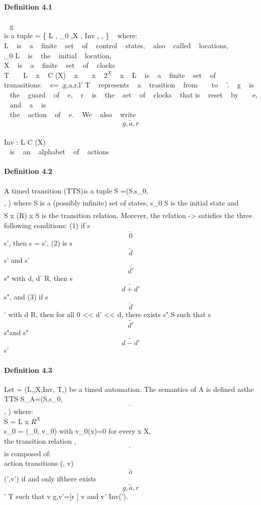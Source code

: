 \paragraph{Definition 4.1}

\ell ~ \boldsymbol \ell  g \\

  is a tuple = \{ L ,  \ell_{0} ,X ,  Inv ,  , \Sigma \} ~ where: \\
L ~  is ~   a  ~  finite ~   set  ~  of  ~  control ~   states, ~   also ~   called ~   locations, \\
\ell_{0}    \in L  ~  is  ~  the ~   initial  ~  location,  ~  \\
X   ~ is  ~  a ~   finite  ~  set  ~  of  ~  clocks \\
T ~   \subseteq ~   L ~  x ~ C (X) ~  x  ~ \sigma  ~ x  ~ $2^{X}$ ~ x ~ L  ~ is  ~ a  ~ finite ~  set  ~ of ~  tranasitions: ~   e= \langle \ell ,g,a,r,l' \rangle  \in T ~  represents ~   a   ~ trasition  ~  from ~   \ell ~  to  ~  \ell'. ~  g  ~  is  ~  the   ~ guard   ~ of ~   e, ~   r  ~  is  ~  the  ~  set  ~  of  ~  clocks  ~  that  is ~   reset  ~  by ~    ~  e, \\ ~   and   ~   a ~   is \\  ~  the  ~  action  ~  of  ~  e.  ~  We ~   also ~   write  ~  \ell    $$\underrightarrow{g,a,r}  $$ \\
Inv : L \to C (X) \\
\Sigma  ~ is  ~ an  ~ alphabet  ~  of  ~  actions
\paragraph{Definition 4.2}
A timed transition (TTS)is a tuple S =(S,s_{0},$$\underrightarrow{} $$, \Sigma) where S is a (possibly infinite) set of states, s_{0} \in S is the initial state and $$\underrightarrow{} $$   \subseteq S x (\Sigma \cup R) x S is the transition relation. Morever, the relation -> satisfies the three following conditions:
(1)  if s $$\underrightarrow{0} $$ s', then s = s',  (2) is s$$\underrightarrow{d} $$ s' and s' $$\underrightarrow{d'} $$ s"  with d, d' \in R, then s $$\underrightarrow{d+d'} $$ s", and (3) if s $$\underrightarrow{d} $$ ' with d \in R, then for all 0 << d' << d, there exists s" \in S such that s $$\underrightarrow{d'} $$ s"and s" $$\underrightarrow{d-d'} $$ s'
\paragraph{Definition 4.3}
Let  = (L,\ell,X,Inv, T,\Sigma) be a timed automation. The semantics of A is defined asthe TTS S_{A}=(S,s_{0},$$\underrightarrow{} $$, \Sigma) where:\\
S = L x $R^{X}$  \\
s_{0} = (\ell_{0}, v_{0}) with v_{0}(x)=0 for every x \in X, \\
the transition relation  ,$$\underrightarrow{} $$ is composed of: \\
action transitions (\ell, v)$$\underrightarrow{a} $$ (\ell',v') if and only ifthere exists \ell $$\underrightarrow{g,a,r} $$ \ell' \in  T such that v \models g,v'=[r ] v and v' \models Inv(\ell').


